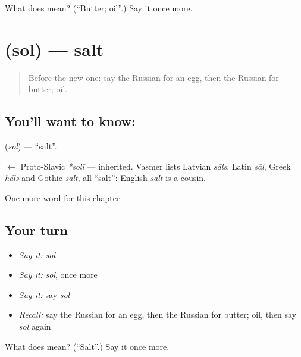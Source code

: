 \begin{tcolorbox}[breakable,colback=teal!4,colframe=teal!35!black,title={Before you move on}]
What does  mean? (\textquotedblleft{}Butter; oil\textquotedblright{}.) Say it once more.
\end{tcolorbox}
\section[\texorpdfstring{\ru{соль} (sol)}{соль (sol)}]{ (sol) — salt}

\label{lesson:RU-C43-salt}



\begin{quote}
Before the new one: say the Russian for an egg, then the Russian for butter; oil.
\end{quote}

\subsection*{You'll want to know: }
\textbf{} (\emph{sol}) — \textquotedblleft{}salt\textquotedblright{}.

\begin{cousinweb}
\textbf{} $\leftarrow$ Proto-Slavic \emph{*solĭ} — inherited. Vasmer lists Latvian \emph{sāls}, Latin \emph{sāl}, Greek \emph{háls} and Gothic \emph{salt}, all \textquotedblleft{}salt\textquotedblright{}: English \emph{salt} is a cousin.
\end{cousinweb}

\begin{grammarlens}[title={What you've built}]
One more word for this chapter.
\end{grammarlens}

\subsection*{Your turn}
\begin{itemize}
\raggedright
  \item \emph{Say it:} \emph{sol}
  \item \emph{Say it:} \emph{sol}, once more
  \item \emph{Say it:} say \emph{sol}
  \item \emph{Recall:} say the Russian for an egg, then the Russian for butter; oil, then say \emph{sol} again
\end{itemize}

\begin{tcolorbox}[breakable,colback=teal!4,colframe=teal!35!black,title={Before you move on}]
What does  mean? (\textquotedblleft{}Salt\textquotedblright{}.) Say it once more.
\end{tcolorbox}

